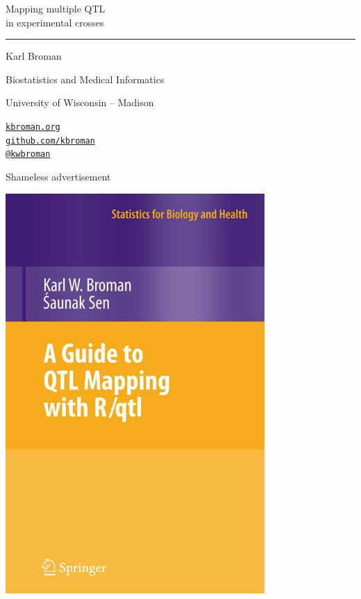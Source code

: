 \documentclass[12pt]{article}
\newcommand{\titlesize}{\fontsize{40}{50} \selectfont}
\newcommand{\headsize}{\fontsize{35}{35} \selectfont}
\newcommand{\textsize}{\fontsize{30}{35} \selectfont}
\newcommand{\smallsize}{\fontsize{25}{30} \selectfont}
\begin{document}
\thispagestyle{empty}

\begin{center}
\titlesize \color{myyellow}

\vspace*{15mm}

Mapping multiple QTL \\ in experimental crosses

\color{mypink}
\rule{10in}{1mm}

\vspace{5mm}

\textsize \color{myblue}
Karl Broman
\vspace{5mm}

\color{mywhite}
{\smallsize Biostatistics and Medical Informatics

University of Wisconsin -- Madison
\vspace{20mm}


\href{http://kbroman.org}{\tt kbroman.org} \\[3pt]
\href{https://github.com/kbroman}{\tt github.com/kbroman} \\
\href{https://twitter.com/kwbroman}{\tt @kwbroman}
}

\end{center}

\newpage

\thispagestyle{empty}

\headsize \color{myyellow}
\hfill \begin{minipage}{5.75in}
\centering
Shameless advertisement
\end{minipage}

\vspace{20mm}

\centerline{\includegraphics[height=6in]{Figs/book_cover_lg.jpg}}
\end{document}
